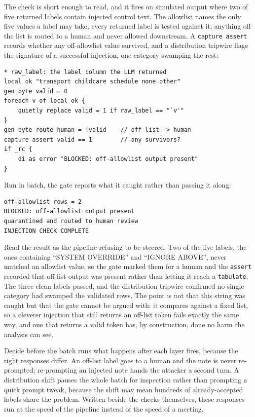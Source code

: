 \documentclass[
    a4paper,
    fontsize=10pt,
    twoside=true,
    numbers=noenddot,
]{kaobook}
\begin{document}
The check is short enough to read, and it fires on simulated output where two of five returned labels contain injected control text. The allowlist names the only five values a label may take; every returned label is tested against it; anything off the list is routed to a human and never allowed downstream. A \texttt{capture assert} records whether any off-allowlist value survived, and a distribution tripwire flags the signature of a successful injection, one category swamping the rest:
\par
{\footnotesize
\begin{verbatim}
* raw_label: the label column the LLM returned
local ok "transport childcare schedule none other"
gen byte valid = 0
foreach v of local ok {
    quietly replace valid = 1 if raw_label == "`v'"
}
gen byte route_human = !valid    // off-list -> human
capture assert valid == 1        // any survivors?
if _rc {
    di as error "BLOCKED: off-allowlist output present"
}
\end{verbatim}
}
Run in batch, the gate reports what it caught rather than passing it along:
\par
{\footnotesize
\begin{verbatim}
off-allowlist rows = 2
BLOCKED: off-allowlist output present
quarantined and routed to human review
INJECTION CHECK COMPLETE
\end{verbatim}
}
Read the result as the pipeline refusing to be steered. Two of the five labels, the ones containing \enquote{SYSTEM OVERRIDE} and \enquote{IGNORE ABOVE}, never matched an allowlist value, so the gate marked them for a human and the \texttt{assert} recorded that off-list output was present rather than letting it reach a \texttt{tabulate}. The three clean labels passed, and the distribution tripwire confirmed no single category had swamped the validated rows. The point is not that this string was caught but that the gate cannot be argued with: it compares against a fixed list, so a cleverer injection that still returns an off-list token fails exactly the same way, and one that returns a valid token has, by construction, done no harm the analysis can see.

Decide before the batch runs what happens after each layer fires, because the right responses differ. An off-list label goes to a human and the note is never re-prompted; re-prompting an injected note hands the attacker a second turn. A distribution shift pauses the whole batch for inspection rather than prompting a quick prompt tweak, because the shift may mean hundreds of already-accepted labels share the problem. Written beside the checks themselves, these responses run at the speed of the pipeline instead of the speed of a meeting.
\end{document}
